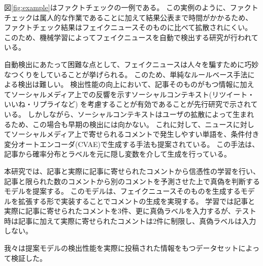 図\ref{fig:example}はファクトチェックの一例である\cite{gillin_2017}。
この実例のように、ファクトチェックは属人的な作業であることに加えて結果公表まで時間がかかるため、
ファクトチェック結果はフェイクニュースそのものに比べて拡散されにくい。
このため、機械学習によってフェイクニュースを自動で検出する研究が行われている。

自動検出にあたって困難な点として、フェイクニュースは人々を騙すために巧妙なつくりをしていることが挙げられる。
このため、単純なルールベース手法による検出は難しい。
検出性能の向上において、記事そのものがもつ情報に加えてソーシャルメディア上での反響を示すソーシャルコンテキスト(リツイート・いいね・リプライなど)
を考慮することが有効であることが先行研究で示されている\cite{Guo:2018:RDH:3269206.3271709}。
しかしながら、ソーシャルコンテキストはユーザの拡散によって生まれるため、この場合も早期の検出には向かない。
これに対して、ニュースに対してソーシャルメディア上で寄せられるコメントで発生しやすい単語を、条件付き変分オートエンコーダ(CVAE)で生成する手法も提案されている\cite{ijcai2018-533}。
この手法は、記事から確率分布とラベルを元に隠し変数を介して生成を行っている。

本研究では、記事と実際に記事に寄せられたコメントから信憑性の学習を行い、記事と限られた数のコメントから別のコメントを予測させた上で真偽を判断するモデルを提案する。
このモデルは、フェイクニュースそのものを生成するモデル\cite{NIPS2019_9106}を拡張する形で実装することでコメントの生成を実現する。
学習では記事と実際に記事に寄せられたコメントを3件、更に真偽ラベルを入力するが、テスト時は記事に加えて実際に寄せられたコメントは2件に制限し、真偽ラベルは入力しない。

我々は提案モデルの検出性能を実際に投稿された情報をもつデータセットによって検証した。
